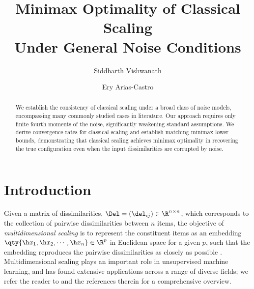 \documentclass[10pt]{article}
\title{Minimax Optimality of Classical Scaling\\ Under General Noise Conditions}
\author[1]{Siddharth Vishwanath}
\author[1,2]{Ery Arias-Castro}
\affil[1]{\small Department of Mathematics, University of California, San Diego}
\affil[2]{\small Halıcıoğlu Data Science Institute, University of California, San Diego}
\date{}
\begin{document}
\maketitle
\vspace*{-3em}
\begingroup
\let\clearpage\relax




\begin{abstract}
We establish the consistency of classical scaling under a broad class of noise models, encompassing many commonly studied cases in literature. Our approach requires only finite fourth moments of the noise, significantly weakening standard assumptions. We derive convergence rates for classical scaling and establish matching minimax lower bounds, demonstrating that classical scaling achieves minimax optimality in recovering the true configuration even when the input dissimilarities are corrupted by noise.
\end{abstract}












\section{Introduction}
\label{sec:introduction}

Given a matrix of dissimilarities, $\Del = (\del_{ij}) \in \R^{n \times n}$, which corresponds to the collection of pairwise dissimilarities between $n$ items, the objective of \textit{multidimensional scaling} is to represent the constituent items as an embedding $\qty{\h x_1, \h x_2, \cdots, \h x_n} \in \R^p$ in Euclidean space {for a given $p$}, such that the embedding {reproduces} the pairwise dissimilarities as closely as possible \citep{de198213}.  Multidimensional scaling plays an important role in unsupervised machine learning, and has found extensive applications across a range of diverse fields; we refer the reader to \cite{borg2007modern} and the references therein for a comprehensive overview.
\end{document}

